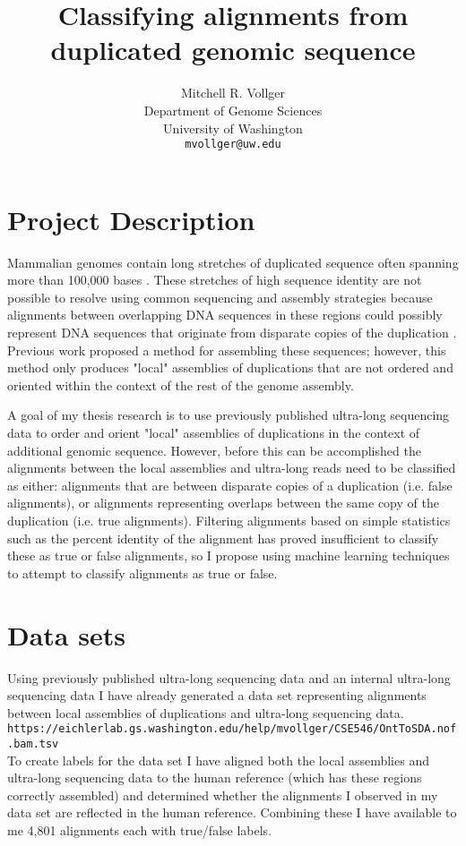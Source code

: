 \documentclass{article}
\title{\large{Classifying alignments from duplicated genomic sequence}}
\author{
  Mitchell R. Vollger
    \\
  Department of Genome Sciences\\
  University of Washington\\
  \texttt{mvollger@uw.edu} \\
}
\begin{document}

\maketitle

\section*{Project Description}

Mammalian genomes contain long stretches of duplicated sequence often spanning more than 100,000 bases \parencite{Lander2001, Waterston2002}. These stretches of high sequence identity are not possible to resolve using common sequencing and assembly strategies because alignments between overlapping DNA sequences in these regions could possibly represent DNA sequences that originate from disparate copies of the duplication \parencite{Pop2004, Chin2016, Gordon2016, Koren2017}. Previous work \parencite{Chaisson2017, Vollger2018} proposed a method for assembling these sequences; however, this method only produces "local" assemblies of duplications that are not ordered and oriented within the context of the rest of the genome assembly.

A goal of my thesis research is to use previously published ultra-long sequencing data \parencite{Jain2018} to order and orient "local" assemblies of duplications in the context of additional genomic sequence. However, before this can be accomplished the alignments between the local assemblies and ultra-long reads need to be classified as either: alignments that are between disparate copies of a duplication (i.e. false alignments), or alignments representing overlaps between the same copy of the duplication (i.e. true alignments). Filtering alignments based on simple statistics such as the percent identity of the alignment has proved insufficient to classify these as true or false alignments, so I propose using machine learning techniques to attempt to classify alignments as true or false. 

\section*{Data sets}
Using previously published ultra-long sequencing data \parencite{Jain2018} and an internal ultra-long sequencing data I have already generated a data set representing alignments between local assemblies of duplications and ultra-long sequencing data.\\
\texttt{https://eichlerlab.gs.washington.edu/help/mvollger/CSE546/OntToSDA.nof.bam.tsv} \\
To create labels for the data set I have aligned both the local assemblies and ultra-long sequencing data to the human reference (which has these regions correctly assembled) and determined whether the alignments I observed in my data set are reflected in the human reference. Combining these I have available to me 4,801 alignments each with true/false labels.  
\end{document}
